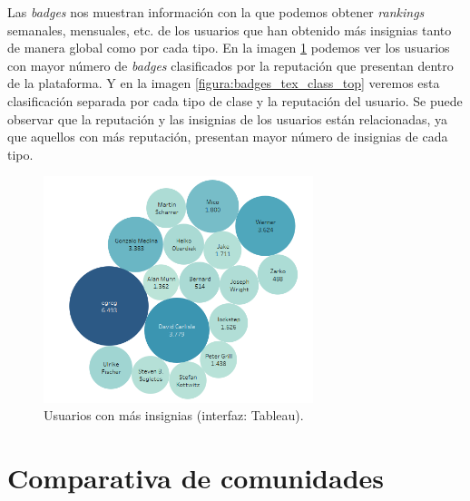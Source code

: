 \documentclass[a4paper, 12pt]{book}
\begin{document}
Las \emph{badges} nos muestran información con la que podemos obtener \emph{rankings} semanales, mensuales, etc. de los usuarios que han obtenido más insignias tanto de manera global como por cada tipo. 
En la imagen \ref{figura:badges_tex_top} podemos ver los usuarios con mayor número de \emph{badges} clasificados por la reputación que presentan dentro de la plataforma. Y en la imagen \ref{figura:badges_tex_class_top} veremos esta clasificación separada por cada tipo de clase y la reputación del usuario.
Se puede observar que la reputación y las insignias de los usuarios están relacionadas, ya que aquellos con más reputación, presentan mayor número de insignias de cada tipo. 

\begin{figure}[ht]
    \centering
    \includegraphics[width=0.7\textwidth]{img/tex/Popular_users_badges_tex.png}
    \caption{Usuarios con más insignias (interfaz: Tableau).}
    \label{figura:badges_tex_top}
\end{figure}



\clearpage 

\section{Comparativa de comunidades}
\label{chap:compare_community}
\end{document}
